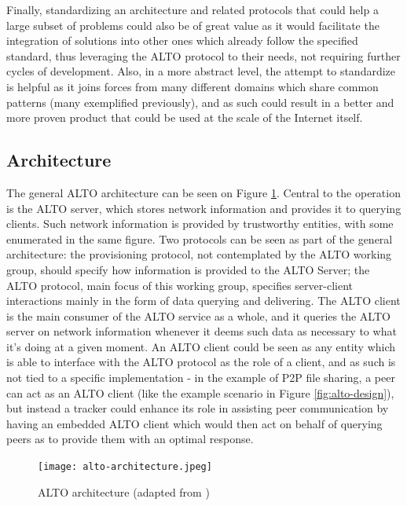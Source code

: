 \documentclass[
  oneside,
  11pt, a4paper,
  footinclude=true,
  headinclude=true,
  cleardoublepage=empty
]{scrbook}
\begin{document}
    Finally, standardizing an architecture and related protocols that could help a large subset of problems could also be of great value as it would facilitate the integration of solutions into other ones which already follow the specified standard, thus leveraging the ALTO protocol to their needs, not requiring further cycles of development. Also, in a more abstract level, the attempt to standardize is helpful as it joins forces from many different domains which share common patterns (many exemplified previously), and as such could result in a better and more proven product that could be used at the scale of the Internet itself.
    
    \subsection{Architecture}
    
    
    The general ALTO architecture can be seen on Figure \ref{fig:alto-architecture}. Central to the operation is the ALTO server, which stores network information and provides it to querying clients. Such network information is provided by trustworthy entities, with some enumerated in the same figure. Two protocols can be seen as part of the general architecture: the provisioning protocol, not contemplated by the ALTO working group, should specify how information is provided to the ALTO Server; the ALTO protocol, main focus of this working group, specifies server-client interactions mainly in the form of data querying and delivering. The ALTO client is the main consumer of the ALTO service as a whole, and it queries the ALTO server on network information whenever it deems such data as necessary to what it's doing at a given moment. An ALTO client could be seen as any entity which is able to interface with the ALTO protocol as the role of a client, and as such is not tied to a specific implementation - in the example of P2P file sharing, a peer can act as an ALTO client (like the example scenario in Figure \ref{fig:alto-design}), but instead a tracker could enhance its role in assisting peer communication by having an embedded ALTO client which would then act on behalf of querying peers as to provide them with an optimal response.
   
    \begin{figure}[!t]
    \centering
    \texttt{[image: alto-architecture.jpeg]}
    \caption{ALTO architecture (adapted from \cite{alto-protocol}) }
    \label{fig:alto-architecture}
    \end{figure}
   
\end{document}
